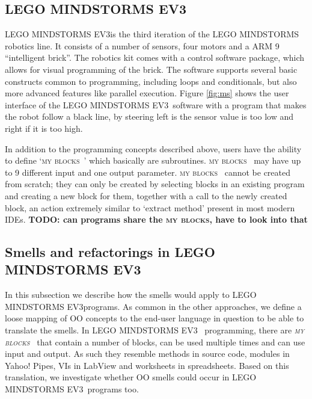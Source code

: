 \documentclass{sig-alternate}
\newcommand{\todo}[1]{\textbf{TODO: #1}}
\newcommand{\ms}{LEGO MINDSTORMS EV3}
\newcommand{\mbs}{\textsc{my blocks}}
\begin{document}
\subsection{\ms}
\ms is the third iteration of the LEGO MINDSTORMS robotics line. It consists of a number of sensors, four motors and a ARM 9 ``intelligent brick''. The robotics kit comes with a control software package, which allows for visual programming of the brick. The software supports several basic constructs common to programming, including loops and conditionals, but also more advanced features like parallel execution. Figure \ref{fig:ms} shows the user interface of the \ms~software with a program that makes the robot follow a black line, by steering left is the sensor value is too low and right if it is too high. 

In addition to the programming concepts described above, users have the ability to define `\mbs~' which basically are subroutines. \mbs~ may have up to 9 different input and one output parameter. \mbs~ cannot be created from scratch; they can only be created by selecting blocks in an existing program and creating a new block for them, together with a call to the newly created block, an action extremely similar to `extract method' present in most modern IDEs. \todo{can programs share the \mbs, have to look into that}

\subsection{Smells and refactorings in \ms }
In this subsection we describe how the smells would apply to \ms programs. As common in the other approaches, we define a loose mapping of OO concepts to the end-user language in question to be able to translate the smells. In \ms~ programming, there are  \emph{\mbs~} that contain a number of blocks, can be used multiple times and can use input and output. As such they resemble methods in source code, modules in Yahoo! Pipes, VIs in LabView and worksheets in spreadsheets. Based on this translation, we investigate whether OO smells could occur in \ms~programs too. 
\end{document}
